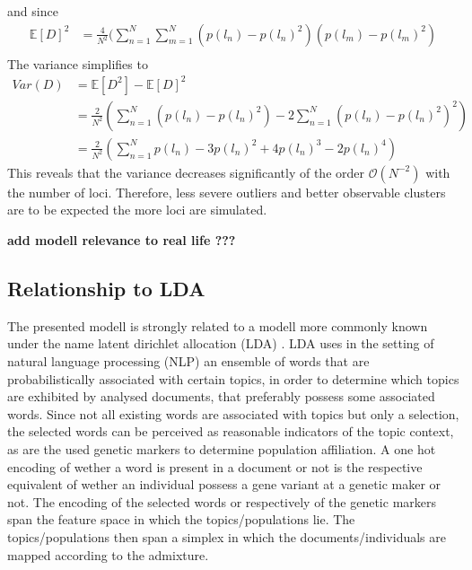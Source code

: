 \documentclass[a4paper, 11pt]{article}
\begin{document}
and since
\begin{align*}
\mathbb{E}[D]^2 &= \frac{4}{N^2}( \sum^{N}_{n = 1}\sum^{N}_{m = 1} (p(l_n) - p(l_n)^2)(p(l_m)-p(l_m)^2)\\
\end{align*}
The variance simplifies to
\begin{align*}
Var(D) &= \mathbb{E}[D^2] - \mathbb{E}[D]^2\\
&= \frac{2}{N^2} (\sum^{N}_{n = 1} (p(l_n) - p(l_n)^2) - 2\sum^{N}_{n = 1} (p(l_n) - p(l_n)^2)^2) \\
&= \frac{2}{N^2} (\sum^{N}_{n = 1} p(l_n) - 3p(l_n)^2 + 4p(l_n)^3 - 2p(l_n)^4)
\end{align*}
This reveals that the variance decreases significantly of the order $\mathcal{O}(N^{-2})$ with the number of loci. Therefore, less severe outliers and better observable clusters are to be expected the more loci are simulated.

\textbf{add modell relevance to real life ???}
\\
\subsection{Relationship to LDA}
The presented modell is strongly related to a modell more commonly known under the name latent dirichlet allocation (LDA) \cite{blei2003latent}. LDA uses in the setting of natural language processing (NLP) an ensemble of words that are probabilistically associated with certain topics, in order to determine which topics are exhibited by analysed documents, that preferably possess some  associated words. Since not all existing words are associated with topics but only a selection, the selected words can be perceived as reasonable indicators of the topic context, as are the used genetic markers to determine population affiliation. A one hot encoding of wether a word is present in a document or not is the respective equivalent of wether an individual possess a gene variant at a genetic maker or not. The encoding of the selected words or respectively of the genetic markers span the feature space in which the topics/populations lie. The topics/populations then span a simplex in which the documents/individuals are mapped according to the admixture. \\

\end{document}
